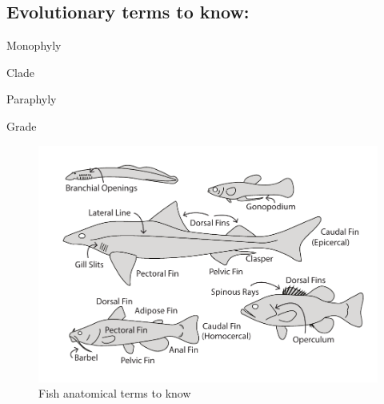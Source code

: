 \documentclass[a4paper,12pt]{article}
\begin{document}
\begin{singlespace}
\section*{Evolutionary terms to know:}
\begin{itemize}
  \large{
  \item{Monophyly}
  \item{Clade}
  \item{Paraphyly}
  \item{Grade}
  }
\end{itemize}
\end{singlespace}

\begin{figure}[h]
\centering
  \includegraphics{FishAnatomy.pdf}
  \caption{Fish anatomical terms to know}
  \label{fig:FishAnatomy}
\end{figure}
\end{document}
